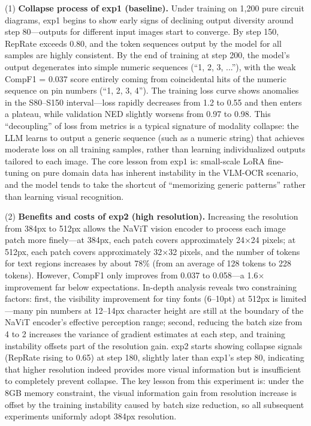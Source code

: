 (1) \textbf{Collapse process of exp1 (baseline).} Under training on 1,200 pure circuit diagrams, exp1 begins to show early signs of declining output diversity around step 80---outputs for different input images start to converge. By step 150, RepRate exceeds 0.80, and the token sequences output by the model for all samples are highly consistent. By the end of training at step 200, the model's output degenerates into simple numeric sequences (``1, 2, 3, ...''), with the weak CompF1 = 0.037 score entirely coming from coincidental hits of the numeric sequence on pin numbers (``1, 2, 3, 4''). The training loss curve shows anomalies in the S80--S150 interval---loss rapidly decreases from 1.2 to 0.55 and then enters a plateau, while validation NED slightly worsens from 0.97 to 0.98. This ``decoupling'' of loss from metrics is a typical signature of modality collapse: the LLM learns to output a generic sequence (such as a numeric string) that achieves moderate loss on all training samples, rather than learning individualized outputs tailored to each image. The core lesson from exp1 is: small-scale LoRA fine-tuning on pure domain data has inherent instability in the VLM-OCR scenario, and the model tends to take the shortcut of ``memorizing generic patterns'' rather than learning visual recognition.

(2) \textbf{Benefits and costs of exp2 (high resolution).} Increasing the resolution from 384px to 512px allows the NaViT vision encoder to process each image patch more finely---at 384px, each patch covers approximately 24$\times$24 pixels; at 512px, each patch covers approximately 32$\times$32 pixels, and the number of tokens for text regions increases by about 78\% (from an average of 128 tokens to 228 tokens). However, CompF1 only improves from 0.037 to 0.058---a 1.6$\times$ improvement far below expectations. In-depth analysis reveals two constraining factors: first, the visibility improvement for tiny fonts (6--10pt) at 512px is limited---many pin numbers at 12--14px character height are still at the boundary of the NaViT encoder's effective perception range; second, reducing the batch size from 4 to 2 increases the variance of gradient estimates at each step, and training instability offsets part of the resolution gain. exp2 starts showing collapse signals (RepRate rising to 0.65) at step 180, slightly later than exp1's step 80, indicating that higher resolution indeed provides more visual information but is insufficient to completely prevent collapse. The key lesson from this experiment is: under the 8GB memory constraint, the visual information gain from resolution increase is offset by the training instability caused by batch size reduction, so all subsequent experiments uniformly adopt 384px resolution.

